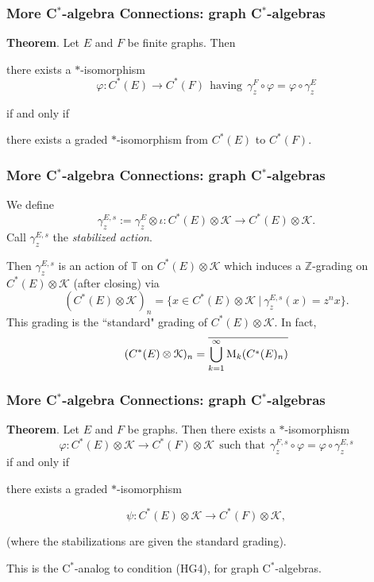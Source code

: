 \documentclass{beamer}
\begin{document}
\begin{frame}
\frametitle{More C$^*$-algebra Connections: graph C$^*$-algebras}

{\bf Theorem}.  
Let $E$ and $F$ be finite graphs.  Then 

\medskip

there exists a $*$-isomorphism $$\varphi \colon C^*(E) \to C^*(F) \ \ \mbox{having} \ \  \gamma_z^F \circ \varphi = \varphi \circ \gamma_z^E$$

\medskip

 if and only if 
 
 \medskip
 
 there exists a graded $*$-isomorphism from $C^*(E)$ to $C^*(F)$.


 \end{frame}
 

\begin{frame}
\frametitle{More C$^*$-algebra Connections: graph C$^*$-algebras}

We define 
 $$\gamma_z^{E, s} := \gamma_z^{E} \otimes \iota : C^*(E) \otimes \mathcal{K} \to C^*(E) \otimes \mathcal{K}.$$   
 Call $\gamma_z^{E, s}$ the \emph{stabilized action}.

\bigskip


  Then $\gamma_z^{E,s}$ is an action of $\mathbb{T}$ on $C^*(E) \otimes \mathcal{K}$ which induces a $\mathbb{Z}$-grading on  $C^*(E) \otimes \mathcal{K}$ (after closing) via
$$
(C^*(E)\otimes\mathcal{K})_n = \{ x \in C^*(E)\otimes \mathcal{K}  \ | \  \gamma_z^{E,s}(x)=z^n x \}.
$$
This grading is the ``standard" grading of $C^*(E)\otimes \mathcal{K}$.  In fact,
$$
(C^*(E) \otimes \mathcal{K})_n = \overline{ \bigcup_{k=1}^\infty {\rm M}_k( C^*(E)_n)  }
$$



 \end{frame}
 

\begin{frame}
\frametitle{More C$^*$-algebra Connections: graph C$^*$-algebras}



{\bf Theorem}. 
Let $E$ and $F$ be graphs.  Then there exists a $*$-isomorphism 
$$\varphi \colon C^*(E) \otimes \mathcal{K} \to C^*(F) \otimes \mathcal{K} \ \ \mbox{such that} \ \  \gamma_z^{F,s} \circ \varphi = \varphi \circ \gamma_z^{E,s}$$
 if and only if 
 
 \medskip
 
 there exists a graded $*$-isomorphism
 
 $$\psi:  C^*(E) \otimes \mathcal{K} \to C^*(F) \otimes \mathcal{K},$$ 
 
 \medskip
 
 (where the stabilizations are given the standard grading).



\bigskip
\bigskip

This is the C$^*$-analog to  condition (HG4), for graph C$^*$-algebras.   
 \end{frame}
\end{document}
